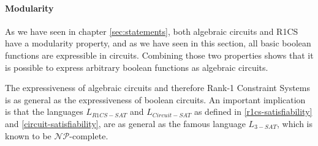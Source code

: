 \paragraph{Modularity} As we have seen in chapter \ref{sec:statements}, both algebraic circuits and R1CS have a modularity property, and as we have seen in this section, all basic boolean functions are expressible in circuits. Combining those two properties shows that it is possible to express arbitrary boolean functions as algebraic circuits.

The expressiveness of algebraic circuits and therefore Rank-1 Constraint Systems is as general as the expressiveness of boolean circuits. An important implication is that the languages $L_{R1CS-SAT}$ and $L_{Circuit-SAT}$ as defined in \ref{r1cs-satisfiability} and \ref{circuit-satisfiability}, are as general as the famous language $L_{3-SAT}$, which is known to be $\mathcal{NP}$-complete. 
